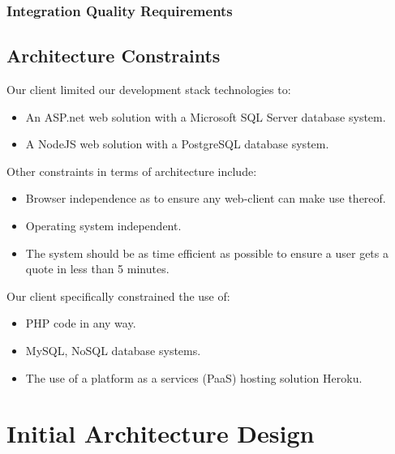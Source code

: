 \documentclass{article}
\begin{document}
		\subsubsection{Integration Quality Requirements}

	
	\subsection{Architecture Constraints}
	Our client limited our development stack technologies to:
	\begin{itemize}
		\item An ASP.net web solution with a Microsoft SQL Server database system.
		\item A NodeJS web solution with a PostgreSQL database system.
	\end{itemize}
	Other constraints in terms of architecture include:
	\begin{itemize}
		\item Browser independence as to ensure any web-client can make use thereof.
		\item Operating system independent.
		\item The system should be as time efficient as possible to ensure a user gets a quote in less than 5 minutes.
		\end{itemize}
	Our client specifically constrained the use of:
		\begin{itemize}
		\item PHP code in any way.
		\item MySQL, NoSQL database systems.
		\item The use of a platform as a services (PaaS) hosting solution Heroku.
		\end{itemize}
	
	\section{Initial Architecture Design}


	


	
\end{document}
